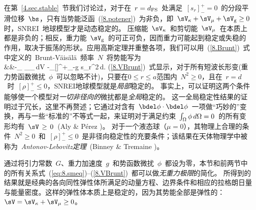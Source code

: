 在第~\ref{4.sec.stable}~节我们讨论过，对于在~$r=d_{\rm FS}$~处满足~$[s_r]^+_-=0$~的分段平滑位移~$\bs$，只有当势能泛函~(\ref{8.potener})~为非负，即~$\sV_{\kappa}+\sV_{\mu}+\sV_{\rm g}\geq 0$时，SNREI~地球模型才是动态稳定的。
%
%
压缩能~$\sV_{\kappa}$~和剪切能~$\sV_{\mu}$~在本质上都是非负的；相反，重力能~$\sV_{\rm g}$~的可正可负，因而重力可能起到稳定或失稳的作用，取决于振荡的形状。应用高斯定理并重整各项，我们可以用~(\ref{8.Brunt})~式中定义的~Brunt-V\"{a}is\"{a}l\"{a}~频率~$N$~将势能写为
\eqa
\label{8.VBrunt}
 \nonumber \\
&&\mbox{}-\int_{\subspace}
\bdel_{\!}\phi\cdot\bdel_{\!}\phi\,dV
-\int_{\Sigma}[\rho]^+_-g s_r^2\,d\/\Sigma.
\ena
(\ref{8.VBrunt})~式显示，对于所有短波长形变(重力势函数微扰~$\phi$~可以忽略不计)，只要在$0\leq r\leq a$范围内~$N^2\geq 0$，且在~$r=d$~时~$[\rho]^+_-\leq 0$，SNREI地球模型就是{\em 局部\/}稳定的。
%
%
%
%
事实上，可以证明这两个条件能够使一个模型对{\em 一切非径向的\/}微扰都是{\em 全局\/}稳定的。
%
%
这一全局稳定性结果的证明过于冗长，这里不再赘述；它通过对含有~$\bdel\phi\cdot\bdel\phi$~一项做“巧妙的”变换，再与一些“标准的”不等式一起，来证明对于满足约束~$\int_{\Omega}\phi\,d\/\Omega=0$~的所有变形均有~$\sV\hspace{0.5mm}\geq\hspace{0.5mm}0$~(Aly \& P\'{e}rez \citeyear{aly&perez92})。\vspace{-0.4 mm}
对于一个液态球（$\mu=0$），其物理上合理的条件~$N^2\geq 0$~和~$[\rho]^+_-\leq 0$~是非径向稳定性的充要条件；该结果在天体物理学中被称为~{\em Antonov-Lebovitz定理\/}~(Binney \& Tremaine \citeyear{binney&tremaine87})。
%

通过将引力常数~$G$、重力加速度~$g$~和势函数微扰~$\phi$~都设为零，本节和前两节中的所有关系式~(\ref{eq:8.smeq})--(\ref{8.VBrunt})~都可以做{\em 无重力极限\/}的简化。
%
所得到的结果就是经典的各向同性弹性体所满足的动量方程、边界条件和相应的拉格朗日量与能量密度。这样的弹性体本质上是稳定的，因为其势能全部是弹性的：$\sV=\sV_{\kappa}+\sV_{\mu}\geq 0$。
%
%

